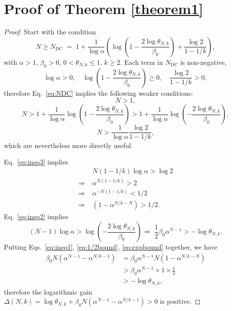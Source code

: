 \documentclass{article}
\theoremstyle{plain}
\begin{document}
\section{Proof of Theorem \ref{theorem1}}\label{app:proof}
\begin{proof}
Start with the condition
\begin{equation}\label{eq:NDC}
N\geq N_{\mathrm{DC}} \;=\; 1 + \frac{1}{\log\alpha}\left(\log\left(1-\frac{2\log\theta_{N,k}}{\beta_0}\right)+\frac{\log 2}{1-1/k}\right),
\end{equation}
with $\alpha>1$, $\beta_0>0$, $0< \theta_{N,k}\leq 1$, $k\geq 2$. Each term in $N_\mathrm{DC}$ is non-negative,
\begin{equation}
    \log\alpha > 0, \quad \log\left(1-\frac{2\log\theta_{N,k}}{\beta_0}\right)\geq 0,\quad \frac{\log 2}{1-1/k}>0,
\end{equation}
therefore Eq.~\eqref{eq:NDC} implies the following weaker conditions:
\begin{equation}\label{eq:ineq1}
    N> 1,
\end{equation}
\begin{equation}\label{eq:ineq2}
    N > 1+\frac{1}{\log\alpha}\log\left(1-\frac{2\log\theta_{N,k}}{\beta_0}\right)>1+\frac{1}{\log\alpha}\log\left(-\frac{2\log\theta_{N,k}}{\beta_0}\right),
\end{equation}
\begin{equation}\label{eq:ineq3}
    N> \frac{1}{\log\alpha}\frac{\log 2}{1-1/k},
\end{equation}
which are nevertheless more directly useful.

Eq.~\eqref{eq:ineq3} implies
\begin{equation}\label{eq:1/2bound}
\begin{split}
    &N(1-1/k)\log\alpha > \log 2 \\
    \Rightarrow\;&\alpha^{N(1-1/k)} > 2 \\\Rightarrow\;&\alpha^{-N(1-1/k)} < 1/2 \\\Rightarrow\;&(1-\alpha^{N/k-N})> 1/2.
\end{split}
\end{equation}
Eq.~\eqref{eq:ineq2} implies
\begin{equation}\label{eq:expbound}
    (N-1)\log\alpha>\log\left(-\frac{2\log\theta_{N,k}}{\beta_0}\right)
    \Rightarrow\;\frac{1}{2}\beta_0\alpha^{N-1}>-\log\theta_{N,k}.
\end{equation}
Putting Eqs.~\eqref{eq:ineq1}, \eqref{eq:1/2bound}, \eqref{eq:expbound} together, we have
\begin{equation}
\begin{split}
    \beta_0 N(\alpha^{N-1}-\alpha^{N/k-1})&=\beta_0 \alpha^{N-1} N (1-\alpha^{N/k-N})\\
    &>\beta_0 \alpha^{N-1} \times 1\times \frac{1}{2}\\
    &>-\log\theta_{N,k},
\end{split}
\end{equation}
therefore the logarithmic gain $\Delta(N,k)=\log\theta_{N,k}+\beta_0 N(\alpha^{N-1}-\alpha^{N/k-1})>0$ is positive.
\end{proof}
\end{document}
